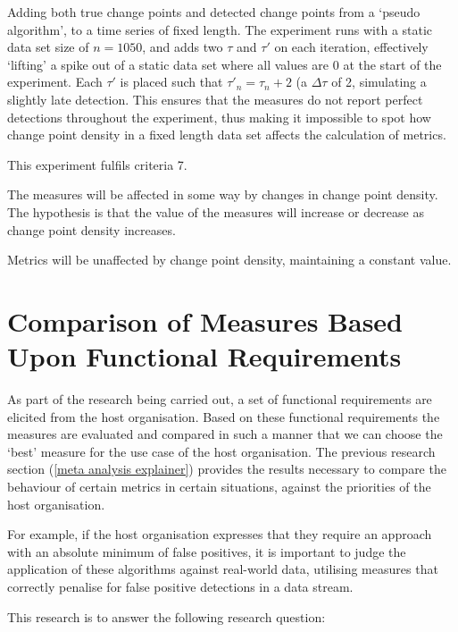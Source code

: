 \documentclass[../main.tex]{subfiles}
\begin{document}
Adding both true change points and detected change points from a `pseudo algorithm', to a time series of fixed length. The experiment runs with a static data set size of $n=1050$, and adds two $\tau$ and $\tau'$ on each iteration, effectively `lifting' a spike out of a static data set where all values are 0 at the start of the experiment. Each $\tau'$ is placed such that $\tau'_n = \tau_n + 2$ (a $\Delta \tau$ of 2, simulating a slightly late detection. This ensures that the measures do not report perfect detections throughout the experiment, thus making it impossible to spot how change point density in a fixed length data set affects the calculation of metrics.

This experiment fulfils criteria 7.

\begin{hypothesis}
    The measures will be affected in some way by changes in change point density. The hypothesis is that the value of the measures will increase or decrease as change point density increases.
\end{hypothesis}

\begin{nullhypothesis}
    Metrics will be unaffected by change point density, maintaining a constant value.
\end{nullhypothesis}

\section{Comparison of Measures Based Upon Functional Requirements}

As part of the research being carried out, a set of functional requirements are elicited from the host organisation. Based on these functional requirements the measures are evaluated and compared in such a manner that we can choose the `best' measure for the use case of the host organisation. The previous research section (\autoref{meta analysis explainer}) provides the results necessary to compare the behaviour of certain metrics in certain situations, against the priorities of the host organisation.

For example, if the host organisation expresses that they require an approach with an absolute minimum of false positives, it is important to judge the application of these algorithms against real-world data, utilising measures that correctly penalise for false positive detections in a data stream.

This research is to answer the following research question:
\end{document}
